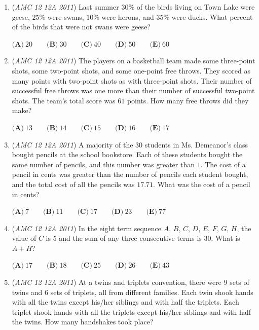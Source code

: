 \begin{enumerate}
	\item (\textit{AMC 12 12A 2011}) Last summer $30\%$ of the birds living on Town Lake were geese, $25\%$ were swans, $10\%$ were herons, and $35\%$ were ducks. What percent of the birds that were not swans were geese?


 $\textbf{(A)}\ 20 \qquad \textbf{(B)}\ 30 \qquad \textbf{(C)}\ 40 \qquad \textbf{(D)}\ 50 \qquad \textbf{(E)}\ 60$


	\item (\textit{AMC 12 12A 2011}) The players on a basketball team made some three-point shots, some two-point shots, and some one-point free throws. They scored as many points with two-point shots as with three-point shots. Their number of successful free throws was one more than their number of successful two-point shots. The team's total score was $61$ points. How many free throws did they make?


 $\textbf{(A)}\ 13 \qquad \textbf{(B)}\ 14 \qquad \textbf{(C)}\ 15 \qquad \textbf{(D)}\ 16 \qquad \textbf{(E)}\ 17$


	\item (\textit{AMC 12 12A 2011}) A majority of the $30$ students in Ms. Demeanor's class bought pencils at the school bookstore. Each of these students bought the same number of pencils, and this number was greater than $1$. The cost of a pencil in cents was greater than the number of pencils each student bought, and the total cost of all the pencils was $17.71$. What was the cost of a pencil in cents?


 $\textbf{(A)}\ 7 \qquad \textbf{(B)}\ 11 \qquad \textbf{(C)}\ 17 \qquad \textbf{(D)}\ 23 \qquad \textbf{(E)}\ 77$


	\item (\textit{AMC 12 12A 2011}) In the eight term sequence $A$, $B$, $C$, $D$, $E$, $F$, $G$, $H$, the value of $C$ is $5$ and the sum of any three consecutive terms is $30$. What is $A+H$?


 $\textbf{(A)}\ 17 \qquad \textbf{(B)}\ 18 \qquad \textbf{(C)}\ 25 \qquad \textbf{(D)}\ 26 \qquad \textbf{(E)}\ 43$


	\item (\textit{AMC 12 12A 2011}) At a twins and triplets convention, there were $9$ sets of twins and $6$ sets of triplets, all from different families. Each twin shook hands with all the twins except his/her siblings and with half the triplets. Each triplet shook hands with all the triplets except his/her siblings and with half the twins. How many handshakes took place?



\end{enumerate}
